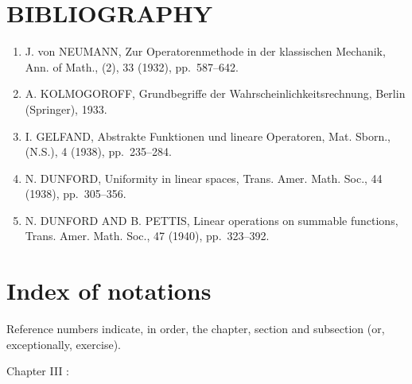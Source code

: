 \chapter*{BIBLIOGRAPHY}
{}

\begin{enumerate}
\def\labelenumi{(\Roman{enumi})}
\item
  J. von NEUMANN, Zur Operatorenmethode in der klassischen Mechanik, Ann. of Math., (2), 33 (1932), pp.~587--642.
\item
  A. KOLMOGOROFF, Grundbegriffe der Wahrscheinlichkeitsrechnung, Berlin (Springer), 1933.
\item
  I. GELFAND, Abstrakte Funktionen und lineare Operatoren, Mat. Sborn., (N.S.), 4 (1938), pp.~235--284.
\item
  N. DUNFORD, Uniformity in linear spaces, Trans. Amer. Math. Soc., 44 (1938), pp.~305--356.
\item
  N. DUNFORD AND B. PETTIS, Linear operations on summable functions, Trans. Amer. Math. Soc., 47 (1940), pp.~323--392.
\end{enumerate}

\chapter*{Index of notations}
{}

Reference numbers indicate, in order, the chapter, section and subsection (or, exceptionally, exercise).

Chapter III :

